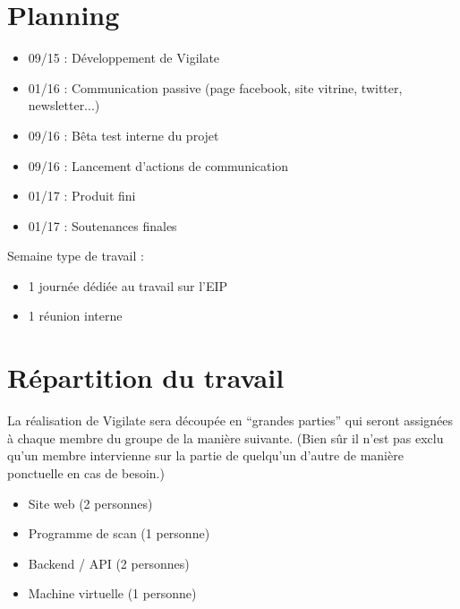 \section{Planning}
\begin{itemize}
\item 09/15 : Développement de Vigilate\\
\item 01/16 : Communication passive (page facebook, site vitrine, twitter, newsletter...)\\
\item 09/16 : Bêta test interne du projet\\
\item 09/16 : Lancement d’actions de communication\\
\item 01/17 : Produit fini\\
\item 01/17 : Soutenances finales\\
\end{itemize}


Semaine type de travail :\\
\begin{itemize}
\item 1 journée dédiée au travail sur l’EIP\\
\item 1 réunion interne\\
\end{itemize}

\section{Répartition du travail}
La réalisation de Vigilate sera découpée en “grandes parties” qui seront assignées à chaque membre du groupe de la manière suivante. (Bien sûr il n’est pas exclu qu’un membre intervienne sur la partie de quelqu’un d’autre de manière ponctuelle en cas de besoin.)\\
\begin{itemize}
\item Site web (2 personnes)\\
\item Programme de scan (1 personne)\\
\item Backend / API (2 personnes)\\
\item Machine virtuelle (1 personne)\\
\end{itemize}